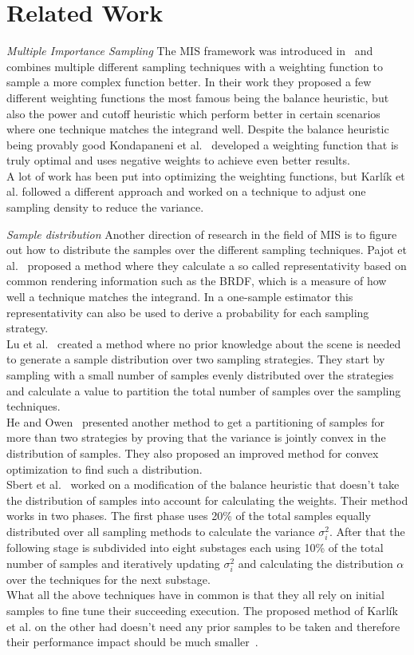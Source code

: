 \chapter{Related Work}
\label{ch:related_work}

\textit{Multiple Importance Sampling} The MIS framework was introduced in~\cite{veach_guibas}
and combines multiple different sampling techniques with a weighting function to sample a more complex function better.
In their work they proposed a few different weighting functions the most famous being the balance heuristic,
but also the power and cutoff heuristic which perform better in certain scenarios where one technique matches the integrand well.
Despite the balance heuristic being provably good Kondapaneni et al.~\cite{Kondapaneni2019} developed a weighting function that is truly optimal
and uses negative weights to achieve even better results.\\
A lot of work has been put into optimizing the weighting functions,
but Karl\'ik et al. followed a different approach
and worked on a technique to adjust one sampling density to reduce the variance.

\textit{Sample distribution} Another direction of research in the field of MIS is to figure out how to distribute the samples over the different sampling techniques.
Pajot et al.~\cite{pajot} proposed a method where they calculate a so called representativity based on common rendering information such as the BRDF,
which is a measure of how well a technique matches the integrand.
In a one-sample estimator this representativity can also be used to derive a probability for each sampling strategy.\\
Lu et al.~\cite{lu} created a method where no prior knowledge about the scene is needed to generate a sample distribution over two sampling strategies.
They start by sampling with a small number of samples evenly distributed over the strategies
and calculate a value to partition the total number of samples over the sampling techniques.\\
He and Owen~\cite{he} presented another method to get a partitioning of samples for more than two strategies
by proving that the variance is jointly convex in the distribution of samples.
They also proposed an improved method for convex optimization to find such a distribution.\\
Sbert et al.~\cite{sbert} worked on a modification of the balance heuristic that doesn't take the distribution of samples into account for calculating the weights.
Their method works in two phases.
The first phase uses 20\% of the total samples equally distributed over all sampling methods to calculate the variance $ \sigma^2_i $.
After that the following stage is subdivided into eight substages each using 10\% of the total number of samples
and iteratively updating $ \sigma^2_i $ and calculating the distribution $ \alpha $ over the techniques for the next substage.\\
What all the above techniques have in common is that they all rely on initial samples to fine tune their succeeding execution.
The proposed method of Karl\'ik et al. on the other had doesn't need any prior samples to be taken and therefore their performance impact should be much smaller~\cite{Karlik2019}.

